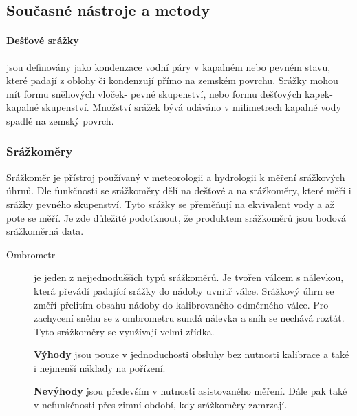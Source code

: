 \documentclass[a4paper,12pt]{article}
\begin{document}
\subsection{Současné nástroje a metody }

\paragraph*{Dešťové srážky}jsou definovány jako kondenzace vodní páry v kapalném nebo pevném stavu, které padají z oblohy či kondenzují přímo na zemském povrchu. Srážky mohou mít formu sněhových vloček- pevné skupenství, nebo formu dešťových kapek- kapalné skupenství. Množství srážek bývá udáváno v milimetrech kapalné vody spadlé na zemský povrch.\cite{wmo}

\subsubsection{Srážkoměry}
Srážkoměr je přístroj používaný v meteorologii a hydrologii k měření srážkových úhrnů. Dle funkčnosti se srážkoměry dělí na dešťové a na srážkoměry, které měří i srážky pevného skupenství. Tyto srážky se přeměňují na ekvivalent vody a až pote se měří. Je zde důležité podotknout, že produktem srážkoměrů jsou bodová srážkoměrná data.


\begin{description} 
\item[Ombrometr]je jeden z nejjednodušších typů srážkoměrů. Je tvořen válcem s nálevkou, která převádí padající srážky do nádoby uvnitř válce. Srážkový úhrn se změří přelitím obsahu nádoby do kalibrovaného odměrného válce. Pro zachycení sněhu se z ombrometru sundá nálevka a sníh se nechává roztát. Tyto srážkoměry se využívají velmi zřídka.

\textbf{Výhody} jsou pouze v jednoduchosti obsluhy bez nutnosti kalibrace a také i nejmenší náklady na pořízení.
   
\textbf{Nevýhody} jsou především v nutnosti asistovaného měření. Dále pak také v nefunkčnosti přes zimní období, kdy srážkoměry zamrzají. 
\end{description}
\end{document}
